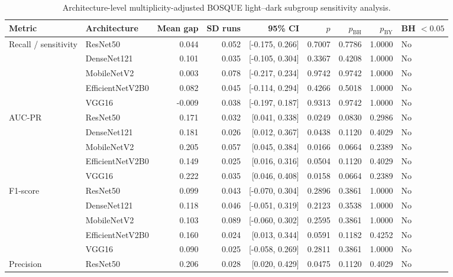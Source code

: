 \begin{table}[h!]
\centering
\scriptsize
\caption{Architecture-level multiplicity-adjusted BOSQUE light--dark subgroup sensitivity analysis.}
\label{tab:architecture-bh-sensitivity}
\setlength{\tabcolsep}{3.3pt}
\renewcommand{\arraystretch}{1.08}
\begin{tabular}{llrrrrrrl}
\toprule
\textbf{Metric} & \textbf{Architecture} & \textbf{Mean gap} & \textbf{SD runs} & \textbf{95\% CI} & \textbf{$p$} & \textbf{$p_{\mathrm{BH}}$} & \textbf{$p_{\mathrm{BY}}$} & \textbf{BH $<0.05$} \\
\midrule
Recall / sensitivity & ResNet50 & 0.044 & 0.052 & [-0.175, 0.266] & 0.7007 & 0.7786 & 1.0000 & No \\
 & DenseNet121 & 0.101 & 0.035 & [-0.105, 0.304] & 0.3367 & 0.4208 & 1.0000 & No \\
 & MobileNetV2 & 0.003 & 0.078 & [-0.217, 0.234] & 0.9742 & 0.9742 & 1.0000 & No \\
 & EfficientNetV2B0 & 0.082 & 0.045 & [-0.114, 0.294] & 0.4266 & 0.5018 & 1.0000 & No \\
 & VGG16 & -0.009 & 0.038 & [-0.197, 0.187] & 0.9313 & 0.9742 & 1.0000 & No \\
\addlinespace
AUC-PR & ResNet50 & 0.171 & 0.032 & [0.041, 0.338] & 0.0249 & 0.0830 & 0.2986 & No \\
 & DenseNet121 & 0.181 & 0.026 & [0.012, 0.367] & 0.0438 & 0.1120 & 0.4029 & No \\
 & MobileNetV2 & 0.205 & 0.057 & [0.045, 0.384] & 0.0166 & 0.0664 & 0.2389 & No \\
 & EfficientNetV2B0 & 0.149 & 0.025 & [0.016, 0.316] & 0.0504 & 0.1120 & 0.4029 & No \\
 & VGG16 & 0.222 & 0.035 & [0.046, 0.408] & 0.0158 & 0.0664 & 0.2389 & No \\
\addlinespace
F1-score & ResNet50 & 0.099 & 0.043 & [-0.070, 0.304] & 0.2896 & 0.3861 & 1.0000 & No \\
 & DenseNet121 & 0.118 & 0.046 & [-0.051, 0.319] & 0.2123 & 0.3538 & 1.0000 & No \\
 & MobileNetV2 & 0.103 & 0.089 & [-0.060, 0.302] & 0.2595 & 0.3861 & 1.0000 & No \\
 & EfficientNetV2B0 & 0.160 & 0.024 & [0.013, 0.344] & 0.0591 & 0.1182 & 0.4252 & No \\
 & VGG16 & 0.090 & 0.025 & [-0.058, 0.269] & 0.2811 & 0.3861 & 1.0000 & No \\
\addlinespace
Precision & ResNet50 & 0.206 & 0.028 & [0.020, 0.429] & 0.0475 & 0.1120 & 0.4029 & No \\

\end{tabular}
\end{table}
